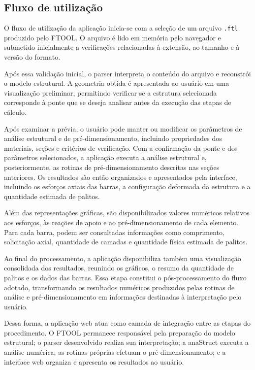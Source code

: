 \subsection{Fluxo de utilização}
\label{subsec:fluxo-aplicacao}

O fluxo de utilização da aplicação inicia-se com a seleção de um arquivo \texttt{.ftl} produzido pelo \acrshort{FTOOL}. O arquivo é lido em memória pelo navegador e submetido inicialmente a verificações relacionadas à extensão, ao tamanho e à versão do formato.

Após essa validação inicial, o parser interpreta o conteúdo do arquivo e reconstrói o modelo estrutural. A geometria obtida é apresentada ao usuário em uma visualização preliminar, permitindo verificar se a estrutura selecionada corresponde à ponte que se deseja analisar antes da execução das etapas de cálculo.

Após examinar a prévia, o usuário pode manter ou modificar os parâmetros de análise estrutural e de pré-dimensionamento, incluindo propriedades dos materiais, seções e critérios de verificação. Com a confirmação da ponte e dos parâmetros selecionados, a aplicação executa a análise estrutural e, posteriormente, as rotinas de pré-dimensionamento descritas nas seções anteriores. Os resultados são então organizados e apresentados pela interface, incluindo os esforços axiais das barras, a configuração deformada da estrutura e a quantidade estimada de palitos.

Além das representações gráficas, são disponibilizados valores numéricos relativos aos esforços, às reações de apoio e ao pré-dimensionamento de cada elemento. Para cada barra, podem ser consultadas informações como comprimento, solicitação axial, quantidade de camadas e quantidade física estimada de palitos.

Ao final do processamento, a aplicação disponibiliza também uma visualização consolidada dos resultados, reunindo os gráficos, o resumo da quantidade de palitos e os dados das barras. Essa etapa constitui o pós-processamento do fluxo adotado, transformando os resultados numéricos produzidos pelas rotinas de análise e pré-dimensionamento em informações destinadas à interpretação pelo usuário.

Dessa forma, a aplicação web atua como camada de integração entre as etapas do procedimento. O \acrshort{FTOOL} permanece responsável pela preparação do modelo estrutural; o parser desenvolvido realiza sua interpretação; a anaStruct executa a análise numérica; as rotinas próprias efetuam o pré-dimensionamento; e a interface web organiza e apresenta os resultados ao usuário.

